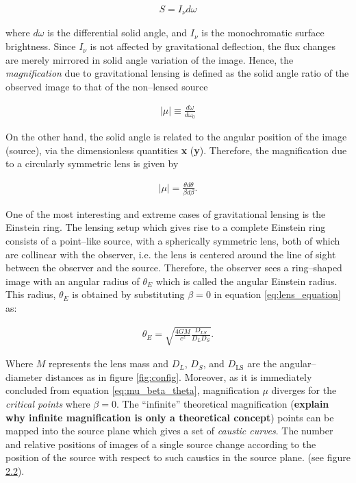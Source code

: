 \documentclass[paper=a4, fontsize=11pt]{scrartcl} %
\numberwithin{equation}{section} %
\numberwithin{figure}{section} %
\numberwithin{table}{section} %
\begin{document}
\begin{eqnarray}
S = I_{\nu} d\omega
\end{eqnarray}

where $d\omega$ is the differential solid angle, and $I_{\nu}$ is the monochromatic surface brightness. Since $I_{\nu}$ is not affected by gravitational deflection, the flux changes are merely mirrored in solid angle variation of the image. Hence, the \emph{magnification} due to gravitational lensing is defined as the solid angle ratio of the observed image to that of the non--lensed source

\begin{eqnarray}
\label{eq:mu_domegas}
|\mu| \equiv \frac{d\omega}{d\omega_0}
\end{eqnarray}

On the other hand, the solid angle is related to the angular position of the image (source), via the dimensionless quantities \textbf{x} (\textbf{y}). Therefore, the magnification due to a circularly symmetric lens is given by 

\begin{eqnarray}
\label{eq:mu_beta_theta}
|\mu| = \frac{\theta d\theta}{\beta d\beta}.
\end{eqnarray}

One of the most interesting and extreme cases of gravitational lensing is the Einstein ring. The lensing setup which gives rise to a complete Einstein ring consists of a point--like source, with a spherically symmetric lens, both of which are collinear with the observer, i.e. the lens is centered around the line of sight between the observer and the source. Therefore, the observer sees a ring--shaped image with an angular radius of $\theta_E$ which is called the angular Einstein radius. This radius, $\theta_E$ is obtained by substituting $\beta=0$ in equation \ref{eq:lens_equation} as:

 \begin{eqnarray}
 \theta_E = \sqrt{\frac{4GM}{c^2}\frac{D_{LS}}{D_LD_S}}.
 \label{eq:lens}
 \end{eqnarray}

 Where $M$ represents the lens mass and $D_L$, $D_S$, and $D_\mathrm{LS}$ are the angular--diameter distances as in figure \ref{fig:config}. Moreover, as it is immediately concluded from equation \ref{eq:mu_beta_theta}, magnification $\mu$ diverges for the \emph{critical points} where $\beta=0$. The ``infinite'' theoretical magnification ({\bf explain why infinite magnification is only a theoretical concept}) points can be mapped into the source plane which gives a set of \emph{caustic curves}. The number and relative positions of images of a single source change according to the position of the source with respect to such caustics in the source plane. (see figure \hyperref[fig:cusps]{2.2}).
\end{document}
